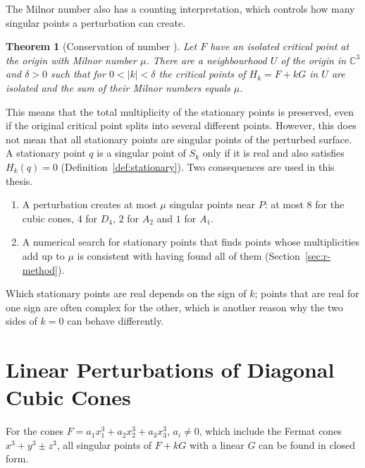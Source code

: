 \documentclass[12pt, a4paper, oneside]{book}
\theoremstyle{plain}
\newtheorem{theorem}{Theorem}[chapter]
\theoremstyle{definition}
\theoremstyle{remark}
\theoremstyle{definition}
\begin{document}
The Milnor number also has a counting interpretation, which controls how many singular points a perturbation can create.

\begin{theorem}[Conservation of number \cite{milnor1968singular,greuel2007introduction}]
\label{thm:conservation}
Let $F$ have an isolated critical point at the origin with Milnor number $\mu$. There are a neighbourhood $U$ of the origin in $\mathbb{C}^3$ and $\delta>0$ such that for $0<|k|<\delta$ the critical points of $H_k=F+kG$ in $U$ are isolated and the sum of their Milnor numbers equals $\mu$.
\end{theorem}

This means that the total multiplicity of the stationary points is preserved, even if the original critical point splits into several different points. However, this does not mean that all stationary points are singular points of the perturbed surface. A stationary point $q$ is a singular point of $S_k$ only if it is real and also satisfies $H_k(q)=0$ (Definition~\ref{def:stationary}). Two consequences are used in this thesis.
\begin{enumerate}
    \item A perturbation creates at most $\mu$ singular points near $P$: at most $8$ for the cubic cones, $4$ for $D_4$, $2$ for $A_2$ and $1$ for $A_1$.
    \item A numerical search for stationary points that finds points whose multiplicities add up to $\mu$ is consistent with having found all of them (Section~\ref{sec:r-method}).
\end{enumerate}
Which stationary points are real depends on the sign of $k$; points that are real for one sign are often complex for the other, which is another reason why the two sides of $k=0$ can behave differently.

\section{Linear Perturbations of Diagonal Cubic Cones}
\label{sec:diagonal}

For the cones $F=a_1x_1^3+a_2x_2^3+a_3x_3^3$, $a_i\neq0$, which include the Fermat cones $x^3+y^3\pm z^3$, all singular points of $F+kG$ with a linear $G$ can be found in closed form.
\end{document}
